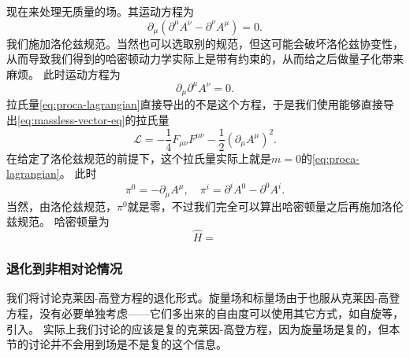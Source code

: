 \documentclass[hyperref, UTF8, a4paper]{ctexart}
\begin{document}
现在来处理无质量的场。其运动方程为
\[
    \partial_\mu (\partial^\mu A^\nu - \partial^\nu A^\mu) = 0.
\]
我们施加洛伦兹规范。当然也可以选取别的规范，但这可能会破坏洛伦兹协变性，从而导致我们得到的哈密顿动力学实际上是带有约束的，从而给之后做量子化带来麻烦。
此时运动方程为
\begin{equation}
    \partial_\mu \partial^\mu A^\nu = 0.
    \label{eq:massless-vector-eq}
\end{equation}
拉氏量\eqref{eq:proca-lagrangian}直接导出的不是这个方程，于是我们使用能够直接导出\eqref{eq:massless-vector-eq}的拉氏量
\begin{equation}
    \mathcal{L} = - \frac{1}{4} F_{\mu \nu} F^{\mu \nu} - \frac{1}{2} (\partial_\mu A^\mu)^2.
\end{equation}
在给定了洛伦兹规范的前提下，这个拉氏量实际上就是$m=0$的\eqref{eq:proca-lagrangian}。
此时
\begin{equation}
    \pi^0 = -\partial_\mu A^\mu, \quad \pi^i = \partial^i A^0 - \partial^0 A^i.
\end{equation}
当然，由洛伦兹规范，$\pi^0$就是零，不过我们完全可以算出哈密顿量之后再施加洛伦兹规范。
哈密顿量为 %
\begin{equation}
    \hat{H} = 
\end{equation}

\subsubsection{退化到非相对论情况}

我们将讨论克莱因-高登方程的退化形式。旋量场和标量场由于也服从克莱因-高登方程，没有必要单独考虑——它们多出来的自由度可以使用其它方式，如自旋等，引入。
实际上我们讨论的应该是复的克莱因-高登方程，因为旋量场是复的，但本节的讨论并不会用到场是不是复的这个信息。
\end{document}
